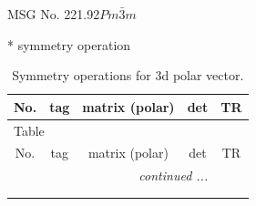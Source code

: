 \documentclass[fleqn,8pt]{jsarticle}
\begin{document}
\setcounter{MaxMatrixCols}{32}

\renewcommand{\tablename}{Table~}
\renewcommand{\figurename}{Figure~}
\begin{center}
\LARGE
MSG No. 221.92\quad$Pm\bar{3}m$
\end{center}
* symmetry operation
\renewcommand{\arraystretch}{1.3}
\begin{longtable}{ccccc}
\caption{Symmetry operations for 3d polar vector.}
 \\
 \hline \hline
No. & tag & matrix (polar) & det & TR \\ \hline \endfirsthead

\multicolumn{4}{l}{\tablename\ \thetable{}} \\
 \hline \hline
No. & tag & matrix (polar) & det & TR \\ \hline \endhead

 \hline \hline
\multicolumn{4}{r}{\footnotesize\it continued ...} \\ \endfoot

 \hline \hline
\multicolumn{4}{r}{} \\ \endlastfoot


\end{longtable}
\end{document}
